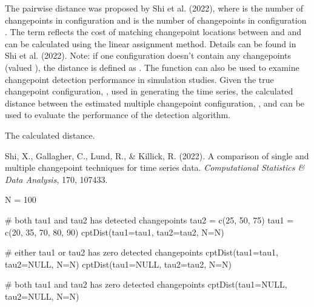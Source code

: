 \documentclass[a4paper]{book}
\begin{document}
%
\begin{Details}
The pairwise distance was proposed by Shi et al. (2022),
where  is the number of changepoints in configuration  and
 is the number of changepoints in configuration .
The term  reflects the cost of matching
changepoint locations between  and  and can be calculated
using the linear assignment method. Details can be found in Shi et al. (2022).
Note: if one configuration doesn't contain any changepoints (valued ),
the distance is defined as . The function can also be used
to examine changepoint detection performance in simulation studies. Given the
true changepoint configuration, , used in generating the time
series, the calculated distance between the estimated multiple changepoint
configuration, , and 
can be used to evaluate the performance of the detection algorithm.
\end{Details}
%
\begin{Value}
\begin{ldescription}
\item[\code{dist}] The calculated distance.
\end{ldescription}
\end{Value}
%
\begin{References}

Shi, X., Gallagher, C., Lund, R., \& Killick, R. (2022).
A comparison of single and multiple changepoint techniques for time series data.
\emph{Computational Statistics \& Data Analysis}, 170, 107433.

\end{References}
%
\begin{Examples}
\begin{ExampleCode}
N = 100

# both tau1 and tau2 has detected changepoints
tau2 = c(25, 50, 75)
tau1 = c(20, 35, 70, 80, 90)
cptDist(tau1=tau1, tau2=tau2, N=N)

# either tau1 or tau2 has zero detected changepoints
cptDist(tau1=tau1, tau2=NULL, N=N)
cptDist(tau1=NULL, tau2=tau2, N=N)

# both tau1 and tau2 has zero detected changepoints
cptDist(tau1=NULL, tau2=NULL, N=N)
\end{ExampleCode}
\end{Examples}
\end{document}
